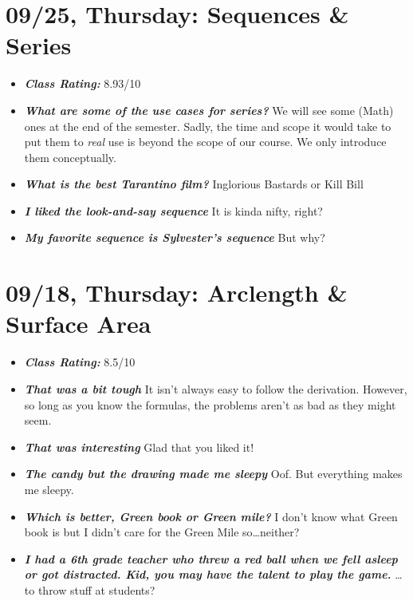 \documentclass[11pt,letterpaper]{article}
\begin{document}
\newpage
\section*{09/25, Thursday: Sequences \& Series\label{09-25}}

\begin{itemize}
\item {\bfseries\itshape Class Rating:} 8.93/10

\item {\bfseries\itshape What are some of the use cases for series?} We will see some (Math) ones at the end of the semester. Sadly, the time and scope it would take to put them to \textit{real} use is beyond the scope of our course. We only introduce them conceptually. 

\item {\bfseries\itshape What is the best Tarantino film?} Inglorious Bastards or Kill Bill

\item {\bfseries\itshape I liked the look-and-say sequence} It is kinda nifty, right?

\item {\bfseries\itshape My favorite sequence is Sylvester's sequence} But why?
\end{itemize}

\newpage
\section*{09/18, Thursday: Arclength \& Surface Area\label{09-18}}

\begin{itemize}
\item {\bfseries\itshape Class Rating:} 8.5/10

\item {\bfseries\itshape That was a bit tough} It isn't always easy to follow the derivation. However, so long as you know the formulas, the problems aren't as bad as they might seem.

\item {\bfseries\itshape That was interesting} Glad that you liked it!

\item {\bfseries\itshape The candy but the drawing made me sleepy} Oof. But everything makes me sleepy.

\item {\bfseries\itshape Which is better, Green book or Green mile?} I don't know what Green book is but I didn't care for the Green Mile so\dots neither?

\item {\bfseries\itshape I had a 6th grade teacher who threw a red ball when we fell asleep or got distracted. Kid, you may have the talent to play the game.} \dots to throw stuff at students?
\end{itemize}
\end{document}
